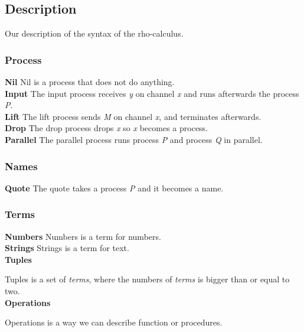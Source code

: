 \subsection{Description}
Our description of the syntax of the rho-calculus.

\subsubsection{Process}
\textbf{Nil}
Nil is a process that does not do anything.
\\
\textbf{Input}
The input process receives \textit{y} on channel \textit{x} and runs afterwards the process \textit{P}.
\\
\textbf{Lift}
The lift process sends \textit{M} on channel \textit{x}, and terminates afterwards.
\\
\textbf{Drop}
The drop process drops \textit{x} so \textit{x} becomes a process.
\\
\textbf{Parallel}
The parallel process runs process \textit{P} and process \textit{Q} in parallel.

\subsubsection{Names}
\textbf{Quote}
The quote takes a process \textit{P} and it becomes a name.

\subsubsection{Terms}
\textbf{Numbers} 
Numbers is a term for numbers.
\\
\textbf{Strings}
Strings is a term for text.
\\
\textbf{Tuples}

Tuples is a set of \textit{terms}, where the numbers of \textit{terms} is bigger than or equal to two.
\\
\textbf{Operations}

Operations is a way we can describe function or procedures.